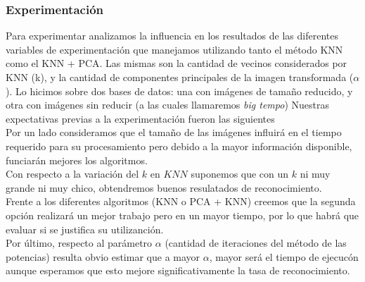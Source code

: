 \subsubsection*{Experimentación}
Para experimentar analizamos la influencia en los resultados de las diferentes variables de experimentación que manejamos utilizando tanto el método KNN como el KNN + PCA. 
Las mismas son la cantidad de vecinos considerados por KNN (k), y la cantidad de componentes principales de la imagen transformada ($\alpha$).
Lo hicimos sobre dos bases de datos: una con im\'agenes de tamaño reducido, y otra con imágenes sin reducir (a las cuales llamaremos \textit{big tempo})
Nuestras expectativas previas a la experimentación fueron las siguientes\\
Por un lado consideramos que el tamaño de las im\'agenes influir\'a en el tiempo requerido para su procesamiento pero debido a la mayor informaci\'on disponible,
funciar\'an mejores los algoritmos.\\
Con respecto a la variaci\'on del $k$ en $KNN$ suponemos que con un $k$ ni muy grande ni muy chico, obtendremos buenos resulatados de reconocimiento.\\
Frente a los diferentes algoritmos (KNN o PCA + KNN) creemos que la segunda opci\'on realizar\'a un mejor trabajo pero en un mayor tiempo, por lo que habr\'a que evaluar si se justifica su utilizanci\'on.\\
Por \'ultimo, respecto al par\'ametro $\alpha$ (cantidad de iteraciones del m\'etodo de las potencias) resulta obvio estimar que a mayor $\alpha$, mayor ser\'a el tiempo de ejecuc\'on aunque esperamos que esto
mejore significativamente la tasa de reconocimiento.





